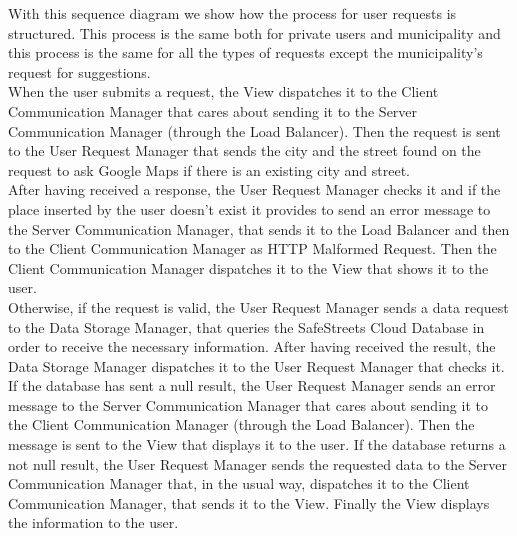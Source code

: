 \documentclass[titlepage]{article}
\begin{document}
With this sequence diagram we show how the process for user requests is structured.
This process is the same both for private users and municipality and this process is the same for all the types of requests except the municipality's request for suggestions.\\
When the user submits a request, the View dispatches it to the Client Communication Manager that cares about sending it to the Server Communication Manager (through the Load Balancer). Then the request is sent to the User Request Manager that sends the city and the street found on the request to ask Google Maps if there is an existing city and street. \\
After having received a response, the User Request Manager checks it and if the place inserted by the user doesn't exist it provides to send an error message to the Server Communication Manager, that sends it to the Load Balancer and then to the Client Communication Manager as HTTP Malformed Request. Then the Client Communication Manager dispatches it to the View that shows it to the user.\\
Otherwise, if the request is valid, the User Request Manager sends a data request to the Data Storage Manager, that queries the SafeStreets Cloud Database in order to receive the necessary information. After having received the result, the Data Storage Manager dispatches it to the User Request Manager that checks it. \\
If the database has sent a null result, the User Request Manager sends an error message to the Server Communication Manager that cares about sending it to the Client Communication Manager (through the Load Balancer).
Then the message is sent to the View that displays it to the user.
If the database returns a not null result, the User Request Manager sends the requested data to the Server Communication Manager that, in the usual way, dispatches it to the Client Communication Manager, that sends it to the View. Finally the View displays the information to the user.
\end{document}
